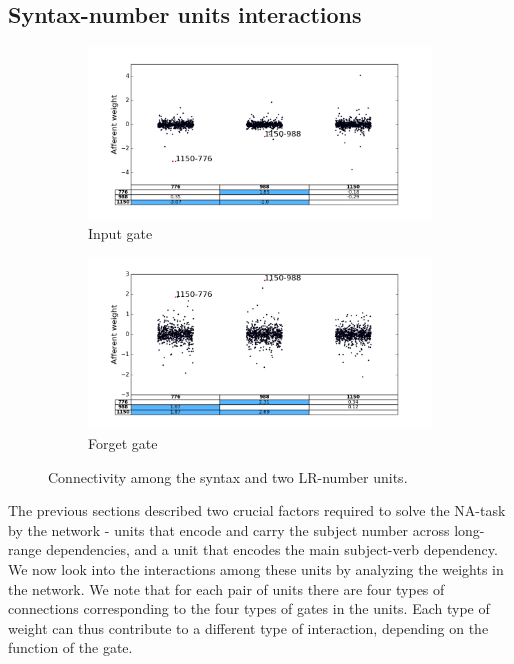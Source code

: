 \subsection{Syntax-number units interactions}

\begin{figure}[t]
    \centering
    \begin{subfigure}{0.49\textwidth}
            \centering
            \includegraphics[width=\textwidth]{Figures/gate_Input_afferent_interactions.png}
            \caption{Input gate}
            \label{fig:interaction-input}
    \end{subfigure}
    \begin{subfigure}{0.49\textwidth}
           \centering
          \includegraphics[width=\textwidth]{Figures/gate_Forget_afferent_interactions.png}
          \caption{Forget gate}
          \label{fig:interaction-forget}
    \end{subfigure}
\caption{Connectivity among the syntax and two LR-number units.}
\label{fig:interaction}
\end{figure}

The previous sections described two crucial factors required to solve the NA-task by the network - units that encode and carry the subject number across long-range dependencies, and a unit that encodes the main subject-verb dependency. We now look into the interactions among these units by analyzing the weights in the network. We note that for each pair of units there are four types of connections corresponding to the four types of gates in the units. Each type of weight can thus contribute to a different type of interaction, depending on the function of the gate. 

